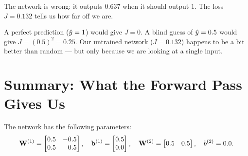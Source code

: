 \documentclass[12pt, a4paper]{article}
\begin{document}
The network is wrong: it outputs $0.637$ when it should output $1$.
The loss $J = 0.132$ tells us how far off we are.

\begin{notebox}
  A perfect prediction ($\hat{y} = 1$) would give $J = 0$.
  A blind guess of $\hat{y} = 0.5$ would give $J = (0.5)^2 = 0.25$.
  Our untrained network ($J = 0.132$) happens to be a bit better than random
  --- but only because we are looking at a single input.
\end{notebox}

\section{Summary: What the Forward Pass Gives Us}
The network has the following parameters:
\[
  \mathbf{W}^{(1)} = \begin{bmatrix} 0.5 & -0.5 \\ 0.5 & \phantom{-}0.5 \end{bmatrix},
  \quad
  \mathbf{b}^{(1)} = \begin{bmatrix} 0.5 \\ 0.0 \end{bmatrix},
  \quad
  \mathbf{W}^{(2)} = \begin{bmatrix} 0.5 & 0.5 \end{bmatrix},
  \quad
  b^{(2)} = 0.0.
\]
\end{document}
